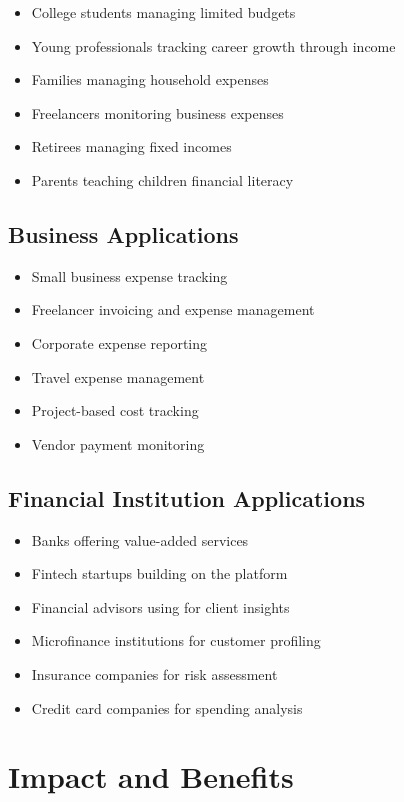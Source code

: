 \documentclass[11pt,a4paper]{report}
\begin{document}
\begin{itemize}
\begin{itemize}
    \item College students managing limited budgets
    \item Young professionals tracking career growth through income
    \item Families managing household expenses
    \item Freelancers monitoring business expenses
    \item Retirees managing fixed incomes
    \item Parents teaching children financial literacy
\end{itemize}

\subsection{Business Applications}

\begin{itemize}
    \item Small business expense tracking
    \item Freelancer invoicing and expense management
    \item Corporate expense reporting
    \item Travel expense management
    \item Project-based cost tracking
    \item Vendor payment monitoring
\end{itemize}

\subsection{Financial Institution Applications}

\begin{itemize}
    \item Banks offering value-added services
    \item Fintech startups building on the platform
    \item Financial advisors using for client insights
    \item Microfinance institutions for customer profiling
    \item Insurance companies for risk assessment
    \item Credit card companies for spending analysis
\end{itemize}

\section{Impact and Benefits}


\end{itemize}
\end{document}
